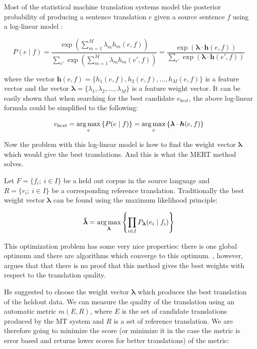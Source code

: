 Most of the statistical machine translation systems model the posterior
probability of producing a sentence translation $e$ given a source sentence $f$
using a log-linear model : 

\newcommand{\vect}[1]{\boldsymbol{#1}}
\begin{equation}
    P(e \mid f) = %
    \frac
        {\exp \left(\sum_{m=1}^M \lambda_m h_m(e,f) \right)}
        {\sum_{e'} \exp \left(\sum_{m=1}^M \lambda_m h_m(e',f)\right)}
    = \frac
    {\exp \left( \vect{\lambda} \cdot \vect{h}(e,f)  \right)}
    {\sum_{e'} \exp \left(\vect{\lambda} \cdot \vect{h}(e',f)\right)}
\end{equation}

\noindent where the vector $\vect{h}(e,f) = \{ h_1(e,f), h_2(e,f), \ldots ,
h_M(e,f) \}$ is a feature vector and the vector $\vect{\lambda} = \{\lambda_1,
\lambda_2, \ldots, \lambda_M \}$ is a feature weight vector. It can be easily
shown that when searching for the best candidate $e_{best}$, the above
log-linear formula could be simplified to the following:

\begin{equation}
  e_{best}  =  \argmax_e \left\{ P(e \mid f) \right\}
  =  \argmax_e \left\{ \vect{\lambda} \cdot \vect{h}(e,f) \right\}
\end{equation}

Now the problem with this log-linear model is how to find the weight vector
$\vect{\lambda}$ which would give the best translations. And this is what the
MERT method solves.

Let $F = \{f_i;~ i \in I\}$ be a held out corpus in the source language and $R
= \{r_i;~ i \in I\}$ be a corresponding reference translation. Traditionally
the best weight vector $\vect{\lambda}$ can be found using the maximum
likelihood principle:

\begin{equation}
  \vect{\hat\lambda} = \argmax_{\vect{\lambda}} \left\{ \prod_{i \in I}
  P_{\vect{\lambda}} (e_i \mid f_i ) 
\right\}
\end{equation}

\noindent This optimization problem has some very nice properties: there is
one global optimum and there are algorithms which converge to this optimum.
, however, argues that that there is no proof that this
method gives the best weights with respect to the translation quality. 

He suggested to choose the weight vector $\vect{\lambda}$ which produces the
best translation of the heldout data. We can measure the quality of the
translation using an automatic metric $m(E,R)$, where $E$ is the set of
candidate translations produced by the MT system and $R$ is a set of reference
translation. We are therefore going to minimize the score (or minimize it in
the case the metric is error based and returns lower scores for better
translations) of the metric:

